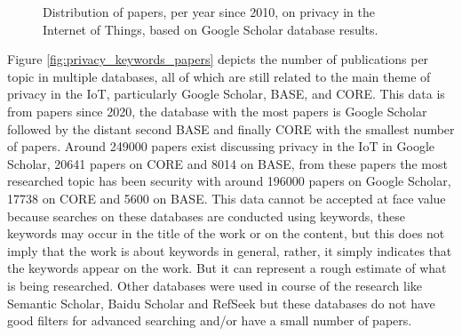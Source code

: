 \begin{figure}
    \begin{center}
        \caption{Distribution of papers, per year since 2010, on privacy in the Internet of Things, based on Google Scholar database results.}
        \label{fig:iotprivacy_papers}
    \end{center}
\end{figure}

Figure \ref{fig:privacy_keywords_papers} depicts the number of publications
per topic in multiple databases, all of which are still related to the main
theme of privacy in the IoT, particularly Google Scholar, BASE, and CORE. This
data is from papers since 2020, the database with the most papers is Google Scholar
followed by the distant second BASE and finally
CORE with the smallest number of papers. Around 249000 papers exist discussing privacy
in the IoT in Google Scholar, 20641 papers on CORE and 8014 on BASE, from these papers
the most researched topic has been security with around 196000 papers on Google Scholar,
17738 on CORE and 5600 on BASE. This data cannot be accepted at face value because
searches on these databases are conducted using keywords, these keywords may occur
in the title of the work or on the content, but this does not imply that the work
is about keywords in general, rather, it simply indicates that the keywords appear
on the work. But it can represent a rough estimate of what is being researched.
Other databases were used in course of the research like Semantic Scholar,
Baidu Scholar and RefSeek but these databases do not have good
filters for advanced searching and/or have a small number of papers.

